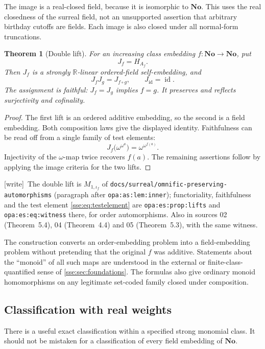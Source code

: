 \documentclass[11pt,a4paper]{article}
\numberwithin{equation}{section}
\theoremstyle{plain}
\newtheorem{theorem}{Theorem}[section]
\theoremstyle{definition}
\theoremstyle{remark}
\newcommand{\No}{\mathbf{No}}
\newcommand{\R}{\mathbb{R}}
\newcommand{\id}{\operatorname{id}}
\newcommand{\lbl}[1]{\nolinkurl{#1}}%
\newcommand{\fn}[1]{\nolinkurl{#1}}%
\newcommand{\wtag}{\textup{\textsf{[write]}}}%
\newenvironment{wnote}{\par\smallskip\noindent\wtag\ }{\par\smallskip}
\begin{document}
The image is a real-closed field, because it is isomorphic to $\No$. This
uses the real closedness of the surreal field, not an unsupported assertion
that arbitrary birthday cutoffs are fields. Each image is also closed
under all normal-form truncations.

\begin{theorem}[Double lift]\label{sse:thm:doublelift}
For an increasing class embedding $f:\No\to\No$, put
\begin{equation}\label{sse:eq:doublelift}
 J_f=H_{A_f}.
\end{equation}
Then $J_f$ is a strongly $\R$-linear ordered-field self-embedding, and
\[
 J_fJ_g=J_{f\circ g},\qquad J_{\id}=\id.
\]
The assignment is faithful: $J_f=J_g$ implies $f=g$. It preserves and
reflects surjectivity and cofinality.
\end{theorem}
\begin{proof}
The first lift is an ordered additive embedding, so the second is a field
embedding. Both composition laws give the displayed identity. Faithfulness
can be read off from a single family of test elements:
\begin{equation}\label{sse:eq:testelement}
 J_f\bigl(\omega^{\omega^a}\bigr)=\omega^{\omega^{f(a)}}.
\end{equation}
Injectivity of the $\omega$-map twice recovers $f(a)$. The remaining
assertions follow by applying the image criteria for the two lifts.
\end{proof}
\begin{wnote}The double lift is $M_{1,\iota_f}$ of \fn{docs/surreal/omnific-preserving-automorphisms} (paragraph after \lbl{opa:as:lem:inner}); functoriality, faithfulness and the test element \cref{sse:eq:testelement} are \lbl{opa:es:prop:lifts} and \lbl{opa:es:eq:witness} there, for order automorphisms. Also in sources 02 (Theorem~5.4), 04 (Theorem~4.4) and 05 (Theorem~5.3), with the same witness.\end{wnote}

The construction converts an order-embedding problem into a field-embedding
problem without pretending that the original $f$ was additive. Statements
about the ``monoid'' of all such maps are understood in the external or
finite-class-quantified sense of \cref{sse:sec:foundations}. The formulas also
give ordinary monoid homomorphisms on any legitimate set-coded family
closed under composition.

\subsection{Classification with real weights}
There is a useful exact classification within a specified strong monomial
class. It should not be mistaken for a classification of every field
embedding of $\No$.
\end{document}
